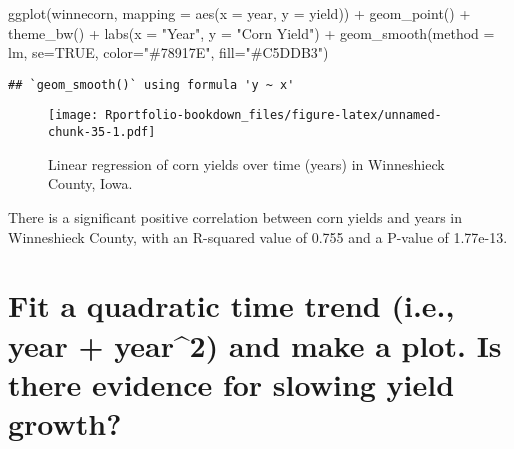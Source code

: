 \documentclass[
]{book}
\newenvironment{Shaded}{\begin{snugshade}}{\end{snugshade}}
\newcommand{\AttributeTok}[1]{\textcolor[rgb]{0.77,0.63,0.00}{#1}}
\newcommand{\CommentTok}[1]{\textcolor[rgb]{0.56,0.35,0.01}{\textit{#1}}}
\newcommand{\ConstantTok}[1]{\textcolor[rgb]{0.00,0.00,0.00}{#1}}
\newcommand{\DecValTok}[1]{\textcolor[rgb]{0.00,0.00,0.81}{#1}}
\newcommand{\FunctionTok}[1]{\textcolor[rgb]{0.00,0.00,0.00}{#1}}
\newcommand{\NormalTok}[1]{#1}
\newcommand{\OtherTok}[1]{\textcolor[rgb]{0.56,0.35,0.01}{#1}}
\newcommand{\SpecialCharTok}[1]{\textcolor[rgb]{0.00,0.00,0.00}{#1}}
\newcommand{\StringTok}[1]{\textcolor[rgb]{0.31,0.60,0.02}{#1}}
\begin{document}
\begin{Shaded}
\begin{Highlighting}[]
\FunctionTok{ggplot}\NormalTok{(winnecorn, }\AttributeTok{mapping =} \FunctionTok{aes}\NormalTok{(}\AttributeTok{x =}\NormalTok{ year, }\AttributeTok{y =}\NormalTok{ yield)) }\SpecialCharTok{+}
  \FunctionTok{geom\_point}\NormalTok{() }\SpecialCharTok{+}
  \FunctionTok{theme\_bw}\NormalTok{() }\SpecialCharTok{+}
  \FunctionTok{labs}\NormalTok{(}\AttributeTok{x =} \StringTok{"Year"}\NormalTok{, }\AttributeTok{y =} \StringTok{"Corn Yield"}\NormalTok{) }\SpecialCharTok{+}
  \FunctionTok{geom\_smooth}\NormalTok{(}\AttributeTok{method =}\NormalTok{ lm, }\AttributeTok{se=}\ConstantTok{TRUE}\NormalTok{, }\AttributeTok{color=}\StringTok{"\#78917E"}\NormalTok{, }\AttributeTok{fill=}\StringTok{"\#C5DDB3"}\NormalTok{)}
\end{Highlighting}
\end{Shaded}

\begin{verbatim}
## `geom_smooth()` using formula 'y ~ x'
\end{verbatim}

\begin{figure}
\centering
\texttt{[image: Rportfolio-bookdown\_files/figure-latex/unnamed-chunk-35-1.pdf]}
\caption{\label{fig:unnamed-chunk-35}Linear regression of corn yields over time (years) in Winneshieck County, Iowa.}
\end{figure}

There is a significant positive correlation between corn yields and years in Winneshieck County, with an R-squared value of 0.755 and a P-value of 1.77e-13.

\hypertarget{fit-a-quadratic-time-trend-i.e.-year-year2-and-make-a-plot.-is-there-evidence-for-slowing-yield-growth}{%
\section{Fit a quadratic time trend (i.e., year + year\^{}2) and make a plot. Is there evidence for slowing yield growth?}\label{fit-a-quadratic-time-trend-i.e.-year-year2-and-make-a-plot.-is-there-evidence-for-slowing-yield-growth}}

\begin{Shaded}
\end{Shaded}
\end{document}
